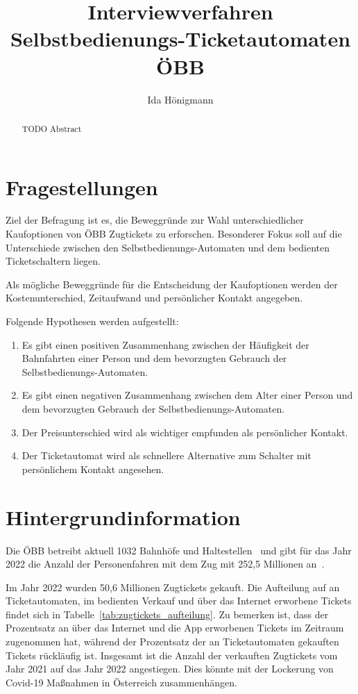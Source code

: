 \documentclass[]{article}
\title{Interviewverfahren\\ Selbstbedienungs-Ticketautomaten ÖBB}
\author{Ida Hönigmann}
\begin{document}
\maketitle

\begin{abstract}
	TODO Abstract
\end{abstract}

\section{Fragestellungen}
\label{sec:fragestellungen}

Ziel der Befragung ist es, die Beweggründe zur Wahl unterschiedlicher Kaufoptionen von ÖBB Zugtickets zu erforschen. Besonderer Fokus soll auf die Unterschiede zwischen den Selbstbedienungs-Automaten und dem bedienten Ticketschaltern liegen.

Als mögliche Beweggründe für die Entscheidung der Kaufoptionen werden der Kostenunterschied, Zeitaufwand und persönlicher Kontakt angegeben.

Folgende Hypothesen werden aufgestellt:

\begin{enumerate}[label={H\arabic*: }]
	\item Es gibt einen positiven Zusammenhang zwischen der Häufigkeit der Bahnfahrten einer Person und dem bevorzugten Gebrauch der Selbstbedienungs-Automaten.
	\item Es gibt einen negativen Zusammenhang zwischen dem Alter einer Person und dem bevorzugten Gebrauch der Selbstbedienungs-Automaten.
	\item Der Preisunterschied wird als wichtiger empfunden als persönlicher Kontakt.
	\item Der Ticketautomat wird als schnellere Alternative zum Schalter mit persönlichem Kontakt angesehen.
\end{enumerate}


\section{Hintergrundinformation}
Die ÖBB betreibt aktuell 1032 Bahnhöfe und Haltestellen~\cite{oebbinfra_zahlendatenfakten2022} und gibt für das Jahr 2022 die Anzahl der Personenfahren mit dem Zug mit 252,5 Millionen an~\cite{oebb_zahlendatenfakten202223}.

Im Jahr 2022 wurden 50,6 Millionen Zugtickets gekauft. Die Aufteilung auf an Ticketautomaten, im bedienten Verkauf und über das Internet erworbene Tickets findet sich in Tabelle~\ref{tab:zugtickets_aufteilung}. Zu bemerken ist, dass der Prozentsatz an über das Internet und die App erworbenen Tickets im Zeitraum zugenommen hat, während der Prozentsatz der an Ticketautomaten gekauften Tickets rückläufig ist. Insgesamt ist die Anzahl der verkauften Zugtickets vom Jahr 2021 auf das Jahr 2022 angestiegen. Dies könnte mit der Lockerung von Covid-19 Maßnahmen in Österreich zusammenhängen.
\end{document}

